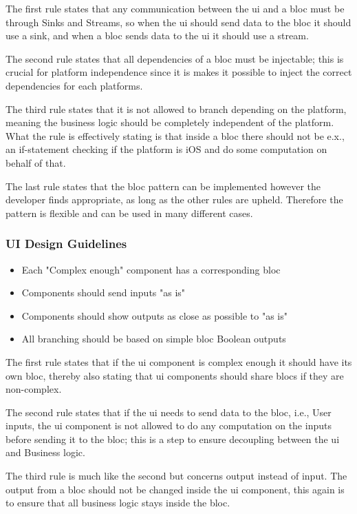 The first rule states that any communication between the \gls{ui} and a \gls{bloc} must be through Sinks and Streams, so when the \gls{ui} should send data to the \gls{bloc} it should use a sink, and when a \gls{bloc} sends data to the \gls{ui} it should use a stream.

The second rule states that all dependencies of a \gls{bloc} must be injectable; this is crucial for platform independence since it is makes it possible to inject the correct dependencies for each platforms.


The third rule states that it is not allowed to branch depending on the platform, meaning the business logic should be completely independent of the platform. What the rule is effectively stating is that inside a \gls{bloc} there should not be e.x., an if-statement checking if the platform is iOS and do some computation on behalf of that.

The last rule states that the \gls{bloc} pattern can be implemented however the developer finds appropriate, as long as the other rules are upheld. Therefore the pattern is flexible and can be used in many different cases.

\subsubsection{UI Design Guidelines} \label{subsubsec: UI_design_guidelines}
\begin{itemize}
  \item Each "Complex enough" component has a corresponding \gls{bloc}
  \item Components should send inputs "as is"
  \item Components should show outputs as close as possible to "as is"
  \item All branching should be based on simple \gls{bloc} Boolean outputs
\end{itemize}

The first rule states that if the \gls{ui} component is complex enough it should have its own \gls{bloc}, thereby also stating that \gls{ui} components should share \glspl{bloc} if they are non-complex.

The second rule states that if the \gls{ui} needs to send data to the \gls{bloc}, i.e., User inputs, the \gls{ui} component is not allowed to do any computation on the inputs before sending it to the \gls{bloc}; this is a step to ensure decoupling between the \gls{ui} and Business logic.

The third rule is much like the second but concerns output instead of input. The output from a \gls{bloc} should not be changed inside the \gls{ui} component, this again is to ensure that all business logic stays inside the \gls{bloc}.


